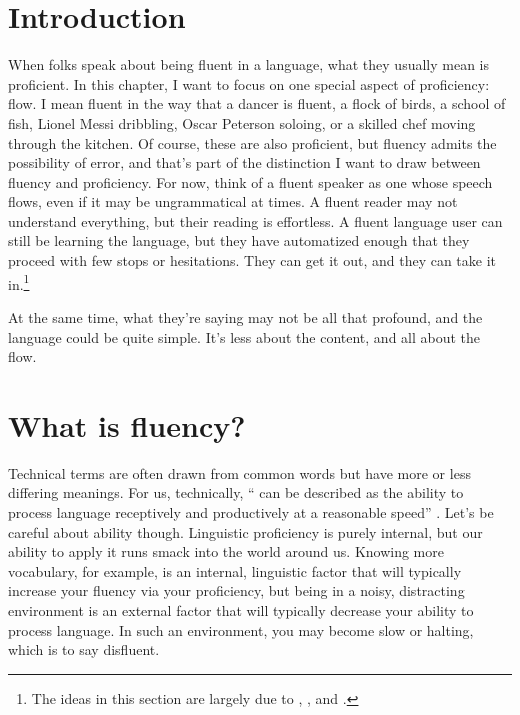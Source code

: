 \section{Introduction}


When folks speak about being fluent in a language, what they usually mean is proficient. In this chapter, I want to focus on one special aspect of proficiency: flow. I mean fluent in the way that a dancer is fluent, a flock of birds, a school of fish, Lionel Messi dribbling, Oscar Peterson soloing, or a skilled chef moving through the kitchen. Of course, these are also proficient, but fluency admits the possibility of error, and that's part of the distinction I want to draw between fluency and proficiency. For now, think of a fluent speaker as one whose speech flows, even if it may be ungrammatical at times. A fluent reader may not understand everything, but their reading is effortless. A fluent language user can still be learning the language, but they have automatized enough that they proceed with few stops or hesitations. They can get it out, and they can take it in.\footnote{The ideas in this section are largely due to \citet{Robinson2011}, \citet{Segalowitz2010}, and \citet{Skehan2003}.}

At the same time, what they're saying may not be all that profound, and the language could be quite simple. It's less about the content, and all about the flow.

\section{What is fluency?} \label{sec:what-is-fluency}

Technical terms are often drawn from common words but have more or less differing meanings. For us, technically, \enquote{ can be described as the ability to process language receptively and productively at a reasonable speed} \citep[11]{Nation2014b}. Let's be careful about ability though. Linguistic proficiency is purely internal, but our ability to apply it runs smack into the world around us. Knowing more vocabulary, for example, is an internal, linguistic factor that will typically increase your fluency via your proficiency, but being in a noisy, distracting environment is an external factor that will typically decrease your ability to process language. In such an environment, you may become slow or halting, which is to say disfluent.

